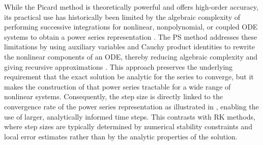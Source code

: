 \documentclass[draft]{agujournal2019}
\begin{document}

While the Picard method is theoretically powerful and offers high-order accuracy, its practical use has historically been limited by the algebraic complexity of performing successive integrations for nonlinear, nonpolynomial, or coupled ODE systems to obtain a power series representation \cite{Ansari2024, Leal2015, Rudmin1998}. The PS method addresses these limitations by using auxiliary variables and Cauchy product identities to rewrite the nonlinear components of an ODE, thereby reducing algebraic complexity and giving recursive approximations \cite{Parker1996, Guenther2019}. This approach preserves the underlying requirement that the exact solution be analytic for the series to converge, but it makes the construction of that power series tractable for a wide range of nonlinear systems. Consequently, the step size is directly linked to the convergence rate of the power series representation as illustrated in , enabling the use of larger, analytically informed time steps. This contrasts with RK methods, where step sizes are typically determined by numerical stability constraints and local error estimates rather than by the analytic properties of the solution.



\end{document}
